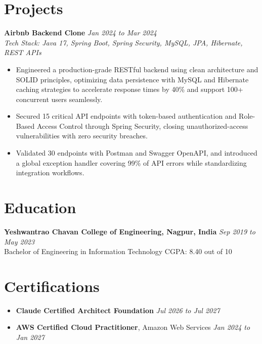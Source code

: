 \documentclass[10pt, letterpaper]{article}
\begin{document}
\section{Projects}

\textbf{Airbnb Backend Clone} \hfill \textit{Jan 2024 to Mar 2024} \\
\textit{Tech Stack: Java 17, Spring Boot, Spring Security, MySQL, JPA, Hibernate, REST APIs}
\begin{itemize}[leftmargin=0.2in, itemsep=1pt, parsep=0pt, topsep=2pt]
    \item Engineered a production-grade RESTful backend using clean architecture and SOLID principles, optimizing data persistence with MySQL and Hibernate caching strategies to accelerate response times by 40\% and support 100+ concurrent users seamlessly.
    \item Secured 15 critical API endpoints with token-based authentication and Role-Based Access Control through Spring Security, closing unauthorized-access vulnerabilities with zero security breaches.
    \item Validated 30 endpoints with Postman and Swagger OpenAPI, and introduced a global exception handler covering 99\% of API errors while standardizing integration workflows.
\end{itemize}

\section{Education}
\textbf{Yeshwantrao Chavan College of Engineering, Nagpur, India} \hfill \textit{Sep 2019 to May 2023} \\
Bachelor of Engineering in Information Technology \hfill CGPA: 8.40 out of 10

\section{Certifications}
\begin{itemize}[leftmargin=0.2in, itemsep=1pt, parsep=0pt, topsep=2pt]
    \item \textbf{Claude Certified Architect Foundation} \hfill \textit{Jul 2026 to Jul 2027}
    \item \textbf{AWS Certified Cloud Practitioner}, Amazon Web Services \hfill \textit{Jan 2024 to Jan 2027}
\end{itemize}
\end{document}

